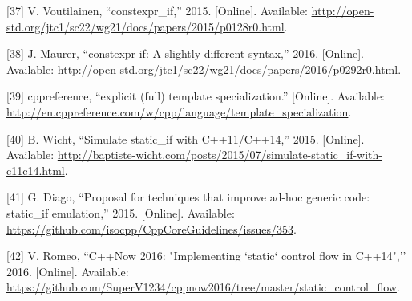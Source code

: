 \documentclass[oneside, 12pt, a4paper, openany]{book}
\begin{document}
\hypertarget{ref-isocpp_sif2}{}
{[}37{]} V. Voutilainen, ``constexpr\_if,'' 2015. {[}Online{]}.
Available:
\url{http://open-std.org/jtc1/sc22/wg21/docs/papers/2015/p0128r0.html}.

\hypertarget{ref-isocpp_sif3}{}
{[}38{]} J. Maurer, ``constexpr if: A slightly different syntax,'' 2016.
{[}Online{]}. Available:
\url{http://open-std.org/jtc1/sc22/wg21/docs/papers/2016/p0292r0.html}.

\hypertarget{ref-cppreference_ets}{}
{[}39{]} cppreference, ``explicit (full) template specialization.''
{[}Online{]}. Available:
\url{http://en.cppreference.com/w/cpp/language/template_specialization}.

\hypertarget{ref-sif0}{}
{[}40{]} B. Wicht, ``Simulate static\_if with C++11/C++14,'' 2015.
{[}Online{]}. Available:
\url{http://baptiste-wicht.com/posts/2015/07/simulate-static_if-with-c11c14.html}.

\hypertarget{ref-sif1}{}
{[}41{]} G. Diago, ``Proposal for techniques that improve ad-hoc generic
code: static\_if emulation,'' 2015. {[}Online{]}. Available:
\url{https://github.com/isocpp/CppCoreGuidelines/issues/353}.

\hypertarget{ref-sif2}{}
{[}42{]} V. Romeo, ``C++Now 2016: "Implementing `static` control flow in
C++14",'' 2016. {[}Online{]}. Available:
\url{https://github.com/SuperV1234/cppnow2016/tree/master/static_control_flow}.
\end{document}
